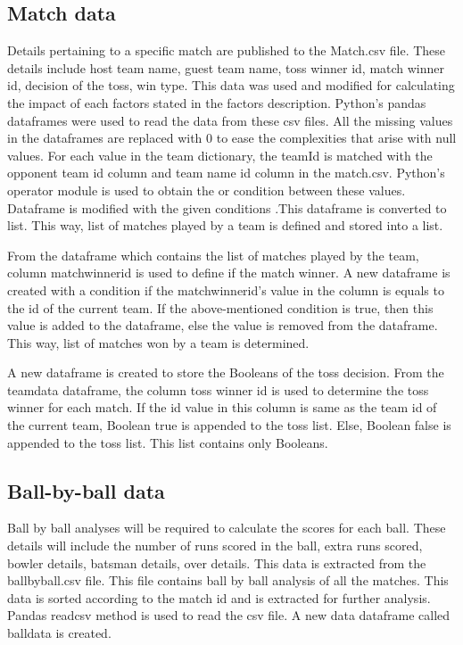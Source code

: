\documentclass[sigconf]{acmart}
\begin{document}
\subsection{Match data}
 
Details pertaining to a specific match are published to the Match.csv file. These details include host team name, guest team name, toss winner id, match winner id, decision of the toss, win type. This data was used and modified for calculating the impact of each factors stated in the factors description. Python’s pandas dataframes were used to read the data from these csv files. All the missing values in the dataframes are replaced with 0 to ease the complexities that arise with null values. 
For each value in the team dictionary, the teamId is matched with the opponent team id column and team name id column in the match.csv. Python’s operator module is used to obtain the or condition between these values. Dataframe is modified with the given conditions .This dataframe is converted to list. This way, list of matches played by a team is defined and stored into a list.


From the dataframe which contains the list of matches played by the team, column matchwinnerid is used to define if the match winner. A new dataframe is created with a condition if the matchwinnerid’s value in the column is equals to the id of the current team. If the above-mentioned condition is true, then this value is added to the dataframe, else the value is removed from the dataframe. This way, list of matches won by a team is determined.


A new dataframe is created to store the Booleans of the toss decision. From the teamdata dataframe, the column toss winner id is used to determine the toss winner for each match. If the id value in this column is same as the team id of the current team, Boolean true is appended to the toss list. Else, Boolean false is appended to the toss list. This list contains only Booleans. 

\subsection{Ball-by-ball data}
Ball by ball analyses will be required to calculate the scores for each ball. These details will include the number of runs scored in the ball, extra runs scored, bowler details, batsman details, over details. This data is extracted from the ballbyball.csv file. This file contains ball by ball analysis of all the matches. This data is sorted according to the match id and is extracted for further analysis. Pandas readcsv method is used to read the csv file. A new data dataframe called balldata is created.
\end{document}
